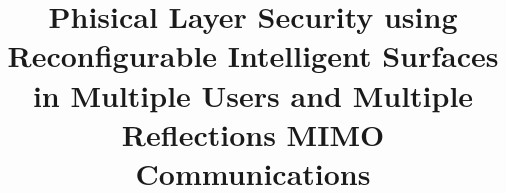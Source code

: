 \documentclass[conference]{IEEEtran}
\begin{document}
\title{Phisical Layer Security using Reconfigurable Intelligent Surfaces in Multiple Users and Multiple Reflections MIMO Communications}


\author{
}

\maketitle



\IEEEpeerreviewmaketitle












\end{document}
